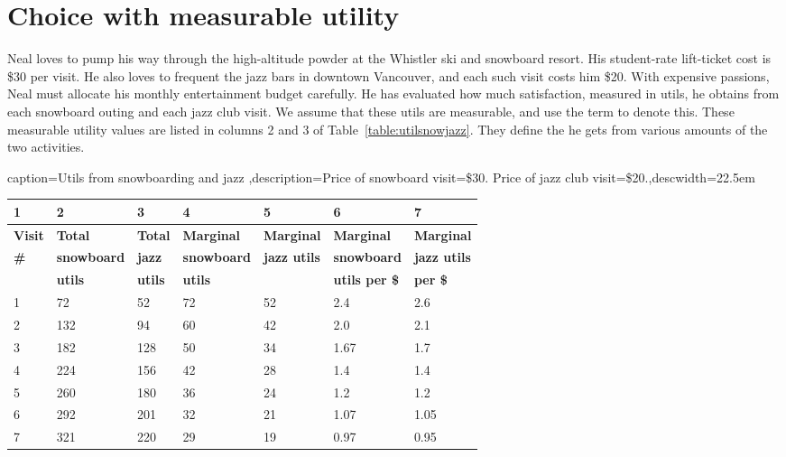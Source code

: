 \section{Choice with measurable utility}\label{sec:ch6sec2}

Neal loves to pump his way through the high-altitude powder at the Whistler
ski and snowboard resort. His student-rate lift-ticket cost is \$30 per
visit. He also loves to frequent the jazz bars in downtown Vancouver, and
each such visit costs him \$20. With expensive passions, Neal must allocate
his monthly entertainment budget carefully. He has evaluated how much
satisfaction, measured in utils, he obtains from each snowboard outing and
each jazz club visit. We assume that these utils are measurable, and use the
term  to denote this. These measurable utility
values are listed in columns 2 and 3 of Table~\ref{table:utilsnowjazz}. They
define the  he gets from various amounts of the
two activities.

\begin{Table}{caption={Utils from snowboarding and jazz \label{table:utilsnowjazz}},description={Price of snowboard visit=\$30. Price of jazz club visit=\$20.},descwidth={22.5em}}
	\begin{tabu} to \linewidth {|X[0.5,c]X[1,c]X[1,c]X[1,c]X[1,c]X[1,c]X[1,c]|} \hline 
			1 & 2 & 3 & 4 & 5 & 6 & 7 \\ \hline 
		\textbf{Visit} & \textbf{Total} & \textbf{Total} & \textbf{Marginal} & \textbf{Marginal} & \textbf{Marginal} & \textbf{Marginal} \\[-0.1em]
		\textbf{\#}	&	\textbf{snowboard}	&	\textbf{jazz}	&	\textbf{snowboard}	&	\textbf{jazz utils}	&	\textbf{snowboard}	&	\textbf{jazz utils}	\\[-0.1em]
			&	\textbf{utils}	&	\textbf{utils}	&	\textbf{utils}	&	&	\textbf{utils per \$}	&	\textbf{per \$}	\\	\hline
			1 & 72 	& 52 	& 72 & 52 & 2.4	& 2.6 	\\
		2 & 132 & 94 	& 60 & 42 & 2.0 & 2.1 	\\
			3 & 182 & 128 & 50 & 34 & 1.67 	& 1.7 	\\ 
		4 & 224 & 156 & 42 & 28 & 1.4 	& 1.4	\\ 
			5 & 260 & 180 & 36 & 24 & 1.2 	& 1.2	\\
		6 & 292 & 201 & 32 & 21 & 1.07 	& 1.05	\\
			7 & 321 & 220 & 29 & 19 & 0.97 	& 0.95	\\ \hline 
	\end{tabu}
\end{Table}

